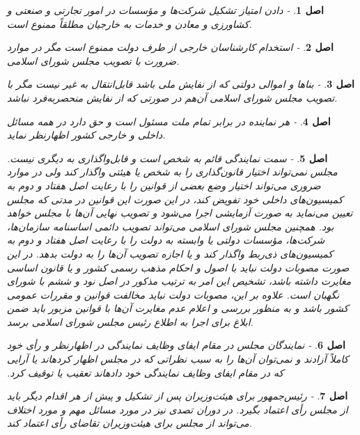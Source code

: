 \documentclass[12pt]{article}
\newtheorem{asl}{اصل}
\begin{document}
\begin{asl}- 
دادن امتیاز تشکیل شرکت‌ها و مؤسسات در امور تجارتی و صنعتی و کشاورزی و معادن و خدمات به خارجیان مطلقاً ممنوع است. 
\end{asl}

\begin{asl}- 
استخدام کارشناسان خارجی از طرف دولت ممنوع است مگر در موارد ضرورت با تصویب مجلس شورای اسلامی. 
\end{asl}

\begin{asl}- 
بناها و اموالی دولتی که از نفایش ملی باشد قابل‌انتقال به غیر نیست مگر با تصویب مجلس شورای اسلامی آن‌هم در صورتی که از نفایش منحصربه‌فرد نباشد. 
\end{asl}

\begin{asl}- 
هر نماینده در برابر تمام ملت مسئول است و حق دارد در همه مسائل داخلی و خارجی کشور اظهارنظر نماید.  
\end{asl}

\begin{asl}- 
سمت نمایندگی قائم به شخص است و قابل‌واگذاری به دیگری نیست. مجلس نمی‌تواند اختیار قانون‌گذاری را به شخص یا هیئتی واگذار کند ولی در موارد ضروری می‌تواند اختیار وضع بعضی از قوانین را با رعایت اصل هفتاد و دوم به کمیسیون‌های داخلی خود تفویض کند، در این صورت این قوانین در مدتی که مجلس تعیین می‌نماید به صورت آزمایشی اجرا می‌شود و تصویب نهایی آن‌ها با مجلس خواهد بود. همچنین مجلس شورای اسلامی می‌تواند تصویب دائمی اساسنامه سازمان‌ها، شرکت‌ها، مؤسسات دولتی یا وابسته به دولت را با رعایت اصل هفتاد و دوم به کمیسیون‌های ذی‌ربط واگذار کند و یا اجازه تصویب آن‌ها را به دولت بدهد. در این صورت مصوبات دولت نباید با اصول و احکام مذهب رسمی کشور و یا قانون اساسی مغایرت داشته باشد، تشخیص این امر به ترتیب مذکور در اصل نود و ششم با شورای نگهبان است. علاوه بر این، مصوبات دولت نباید مخالفت قوانین و مقررات عمومی کشور باشد و به منظور بررسی و اعلام عدم مغایرت آن‌ها با قوانین مزبور باید ضمن ابلاغ برای اجرا به اطلاع رئیس مجلس شورای اسلامی برسد. 
\end{asl}

\begin{asl}- 
نمایندگان مجلس در مقام ایفای وظایف نمایندگی در اظهارنظر و رأی خود کاملاً آزادند و نمی‌توان آن‌ها را به سبب نظراتی که در مجلس اظهار کرده‏اند یا آرایی که در مقام ایفای وظایف نمایندگی خود داده‏اند تعقیب یا توقیف کرد.‏ 
\end{asl}

\begin{asl}- 
رئیس‌جمهور برای هیئت‌وزیران پس از تشکیل و پیش از هر اقدام دیگر باید از مجلس رأی اعتماد بگیرد. در دوران تصدی نیز در مورد مسائل مهم و مورد اختلاف می‌تواند از مجلس برای هیئت‌وزیران تقاضای رأی اعتماد کند. 
\end{asl}
\end{document}
